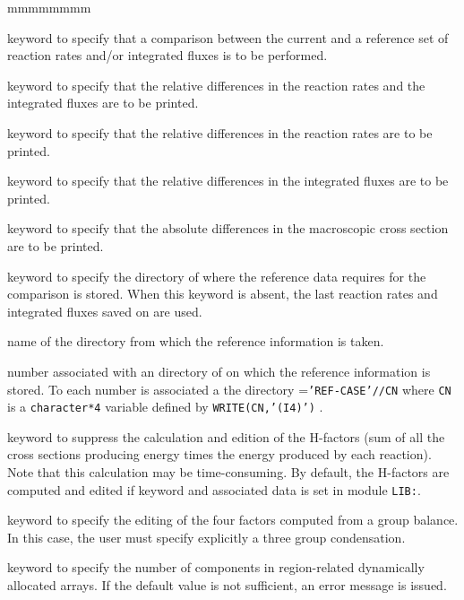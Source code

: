 \begin{ListeDeDescription}{mmmmmmmm}
\item[\moc{STAT}] keyword to specify that a comparison between the current and
a reference set of reaction rates and/or integrated fluxes is to be performed. 

\item[\moc{ALL}] keyword to specify that the relative differences in the
reaction rates and the integrated fluxes are to be printed.

\item[\moc{RATE}] keyword to specify that the relative differences in the
reaction rates are to be printed.

\item[\moc{FLUX}] keyword to specify that the relative differences in the
integrated fluxes are to be printed. 

\item[\moc{DELS}] keyword to specify that the absolute differences in the
macroscopic cross section are to be printed.

\item[\moc{REFE}] keyword to specify the directory of  where the
reference data requires for the comparison is stored. When this keyword is
absent, the last reaction rates and integrated fluxes saved on  are
used.

\item[\dusa{DIRO}] name of the directory from which the reference information
is taken.

\item[\dusa{idiro}] number associated with an directory of  on
which the reference information is  stored. To each number  is
associated a the directory  ={\tt 'REF-CASE'//CN} where {\tt CN} is a
{\tt character*4} variable defined by {\tt WRITE(CN,'(I4)')} . 

\item[\moc{NOHF}] keyword to suppress the calculation and edition of the H-factors (sum of all
the cross sections producing energy times the energy produced by each reaction).
Note that this calculation may be time-consuming. By default, the H-factors are
computed and edited if keyword  and associated data is set in module {\tt LIB:}.

\item[\moc{NBAL}] keyword to specify the editing of the four factors computed
from a group balance. In this case, the user must specify explicitly a three
group condensation.

\item[\moc{MAXR}] keyword to specify the number of components in
region-related dynamically allocated arrays. If the default value is
not sufficient, an error message is issued.


\end{ListeDeDescription}
